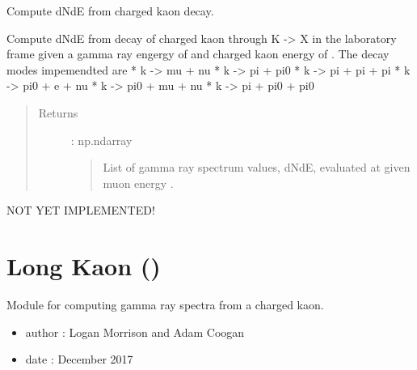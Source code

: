 \documentclass[letterpaper,10pt,english]{sphinxmanual}
\begin{document}
\begin{fulllineitems}
\label{\detokenize{modules:hazma.charged_kaon.decay_spectra}}
Compute dNdE from charged kaon decay.

Compute dNdE from decay of charged kaon through K -\textgreater{} X in the
laboratory frame given a gamma ray engergy of  and charged
kaon energy of . The decay modes impemendted are
* k -\textgreater{} mu  + nu
* k -\textgreater{} pi  + pi0
* k -\textgreater{} pi  + pi  + pi
* k -\textgreater{} pi0 + e   + nu
* k -\textgreater{} pi0 + mu  + nu
* k -\textgreater{} pi  + pi0 + pi0
\begin{quote}\begin{description}
\item[{Returns}] \leavevmode
{} : np.ndarray
\begin{quote}

List of gamma ray spectrum values, dNdE, evaluated at 
given muon energy .
\end{quote}

\end{description}\end{quote}

\end{fulllineitems}


\begin{fulllineitems}
\label{\detokenize{modules:hazma.charged_kaon.fsr}}
NOT YET IMPLEMENTED!

\end{fulllineitems}



\section{Long Kaon ()}
\label{\detokenize{modules:long-kaon-hazma-long-kaon}}\label{\detokenize{modules:module-hazma.charged_kaon}}
Module for computing gamma ray spectra from a charged kaon.
\begin{itemize}
\item {} 
author : Logan Morrison and Adam Coogan

\item {} 
date : December 2017

\end{itemize}
\end{document}
